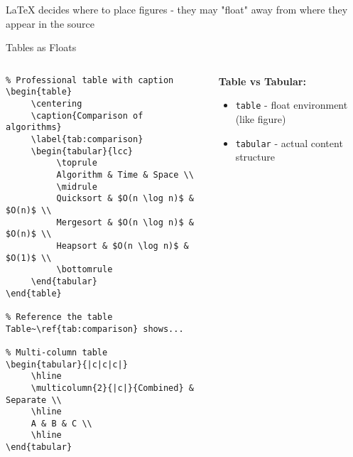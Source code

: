 \begin{frame}
	     
	\begin{warning}
		LaTeX decides where to place figures - they may "float" away from where they appear in the source
	\end{warning}
\end{frame}
\begin{frame}[fragile]{Tables as Floats}
     \begin{columns}
          \begin{column}{0.5\textwidth}
               \begin{lstlisting}
% Professional table with caption
\begin{table}
     \centering
     \caption{Comparison of algorithms}
     \label{tab:comparison}
     \begin{tabular}{lcc}
          \toprule
          Algorithm & Time & Space \\
          \midrule
          Quicksort & $O(n \log n)$ & $O(n)$ \\
          Mergesort & $O(n \log n)$ & $O(n)$ \\
          Heapsort & $O(n \log n)$ & $O(1)$ \\
          \bottomrule
     \end{tabular}
\end{table}

% Reference the table
Table~\ref{tab:comparison} shows...

% Multi-column table
\begin{tabular}{|c|c|c|}
     \hline
     \multicolumn{2}{|c|}{Combined} & Separate \\
     \hline
     A & B & C \\
     \hline
\end{tabular}
               \end{lstlisting}
          \end{column}
          
          \begin{column}{0.5\textwidth}
               \textbf{Table vs Tabular:}
               \begin{itemize}
                    \item \texttt{table} - float environment (like figure)
                    \item \texttt{tabular} - actual content structure
               \end{itemize}
               

\end{column}
\end{columns}
\end{frame}
